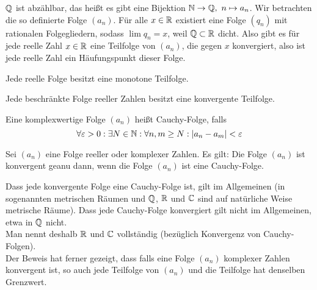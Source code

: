     \begin{bem} $\mathbb{Q}$ ist abzählbar, das heißt es gibt eine Bijektion $\mathbb{N}\to \mathbb{Q}, \ n\mapsto a_n$. Wir betrachten die so definierte Folge $(a_n)$. Für alle $x\in \mathbb{R}$ existiert eine Folge $(q_n)$ mit rationalen Folgegliedern, sodass $\lim q_n =x$, weil $\mathbb{Q}\subset\mathbb{R}$ dicht. Also gibt es für jede reelle Zahl $x\in \mathbb{R}$ eine Teilfolge von $(a_n)$, die gegen $x$ konvergiert, also ist jede reelle Zahl ein Häufungspunkt dieser Folge.  
    \end{bem}
    \begin{lemma}
        Jede reelle Folge besitzt eine monotone Teilfolge.
    \end{lemma}
    \begin{satz}
        Jede beschränkte Folge reeller Zahlen besitzt eine konvergente Teilfolge.
    \end{satz}
    \begin{defn}
        Eine komplexwertige Folge $(a_n)$ heißt Cauchy-Folge, falls 
        \[
        \forall \varepsilon > 0 : \exists N\in \mathbb{N} : \forall n,m\ge N: \vert a_n -a_m \vert < \varepsilon    
        \]        
    \end{defn}
    \begin{satz}
        Sei $(a_n)$ eine Folge reeller oder komplexer Zahlen. Es gilt: Die Folge $(a_n)$ ist konvergent geanu dann, wenn die Folge $(a_n)$ ist eine Cauchy-Folge.
    \end{satz}
    \begin{bem}
        Dass jede konvergente Folge eine Cauchy-Folge ist, gilt im Allgemeinen (in sogenannten metrischen Räumen und $\mathbb{Q}$, $\mathbb{R}$ und $\mathbb{C}$ sind auf natürliche Weise metrische Räume). Dass jede Cauchy-Folge konvergiert gilt nicht im Allgemeinen, etwa in $\mathbb{Q}$ nicht. \\
        Man nennt deshalb $\mathbb{R}$ und $\mathbb{C}$ vollständig (bezüglich Konvergenz von Cauchy-Folgen). \\
        Der Beweis hat ferner gezeigt, dass falls eine Folge $(a_n)$ komplexer Zahlen konvergent ist, so auch jede Teilfolge von $(a_n)$ und die Teilfolge hat denselben Grenzwert.
    \end{bem}
